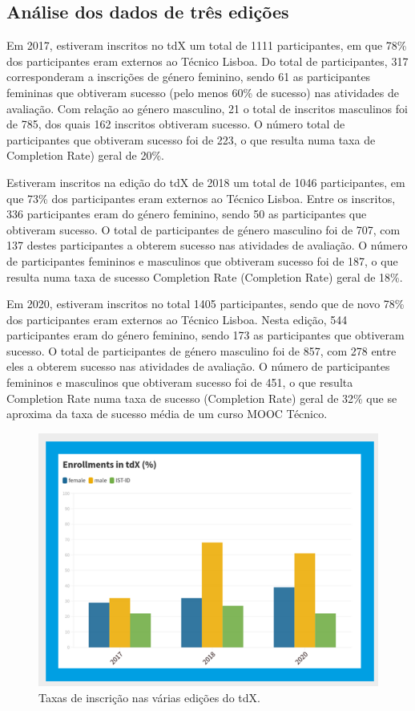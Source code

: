 \subsection{Análise dos dados de três edições}

Em 2017, estiveram inscritos no tdX um total
de 1111 participantes, em que 78\% dos
participantes eram externos ao Técnico Lisboa.
Do total de participantes, 317 corresponderam a inscrições de género feminino, sendo 61 as
participantes femininas que obtiveram sucesso
(pelo menos 60\% de sucesso) nas atividades
de avaliação. Com relação ao género masculino,
21 o total de inscritos masculinos foi de 785, dos quais 162 inscritos obtiveram sucesso. O
número total de participantes que obtiveram
sucesso foi de 223, o que resulta numa taxa de
Completion Rate) geral de 20\%.

Estiveram inscritos na edição do tdX de 2018 um total de 1046 participantes, em que 73\% dos
participantes eram externos ao Técnico Lisboa.
Entre os inscritos, 336 participantes eram do
género feminino, sendo 50 as participantes que
obtiveram sucesso. O total de participantes de
género masculino foi de 707, com 137 destes
participantes a obterem sucesso nas atividades
de avaliação. O número de participantes
femininos e masculinos que obtiveram sucesso
foi de 187, o que resulta numa taxa de sucesso
Completion Rate (Completion Rate) geral de 18\%.

Em 2020, estiveram inscritos no total 1405
participantes, sendo que de novo 78\% dos
participantes eram externos ao Técnico Lisboa.
Nesta edição, 544 participantes eram do género
feminino, sendo 173 as participantes que
obtiveram sucesso. O total de participantes de
género masculino foi de 857, com 278 entre eles a obterem sucesso nas atividades de avaliação. O número de participantes femininos e masculinos que obtiveram sucesso foi de 451, o que resulta Completion Rate numa taxa de sucesso (Completion Rate) geral de 32\% que se aproxima da taxa de sucesso média de um curso MOOC Técnico.

\begin{figure}
    \centering
    \includegraphics[width=.9\textwidth]{chaps/Images/enrollments_tdx.png}
    \caption{Taxas de inscrição nas várias edições do tdX.}
    \label{fig:enrollment_tdx}
\end{figure}

